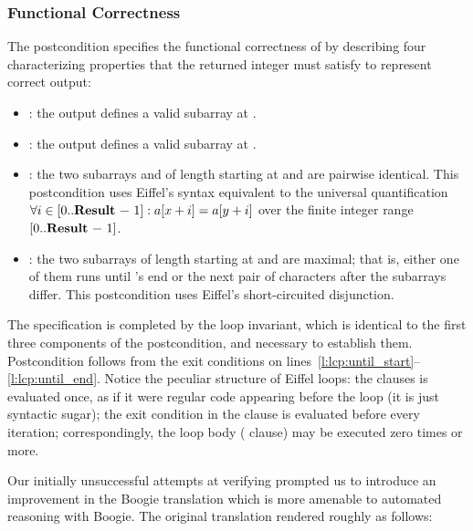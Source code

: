 \subsubsection{Functional Correctness}

The postcondition specifies the functional correctness of  by describing four characterizing properties that the returned integer  must satisfy to represent correct output:
\begin{itemize}
\item
{}: the output  defines a valid subarray at .

\item
{}: the output  defines a valid subarray at .

\item
{}: the two subarrays  and  of length  starting at  and  are pairwise identical.
This postcondition uses Eiffel's  syntax equivalent to the universal quantification $\forall i \in [0..\text{\e{Result - 1}}]: a[x+i] = a[y+i]$ over the finite integer range $[0..\text{\e{Result - 1}}]$.

\item
{}: the two subarrays of length  starting at  and  are maximal; that is, either one of them runs until 's end or the next pair of characters after the subarrays differ.
This postcondition uses Eiffel's  short-circuited disjunction.
\end{itemize}

The specification is completed by the loop invariant, which is identical to the first three components of the postcondition, and necessary to establish them.
Postcondition  follows from the exit conditions on lines~\ref{l:lcp:until_start}--\ref{l:lcp:until_end}.
Notice the peculiar structure of Eiffel loops: the  clauses is evaluated once, as if it were regular code appearing before the loop (it is just syntactic sugar); the exit condition in the  clause is evaluated before every iteration; correspondingly, the loop body ( clause) may be executed zero times or more.

Our initially unsuccessful attempts at verifying  prompted us to introduce an improvement in the Boogie translation which is more amenable to automated reasoning with Boogie.
The original translation rendered  roughly as follows:

